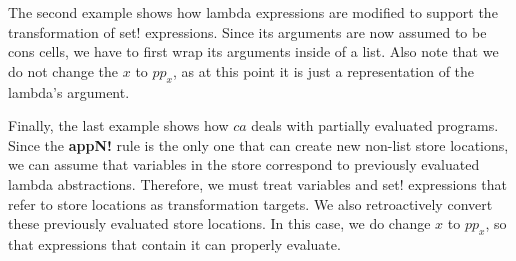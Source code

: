 The second example shows how lambda expressions are modified to support the transformation of set! expressions. Since its arguments are now assumed to be cons cells, we have to first wrap its arguments inside of a list. Also note that we do not change the $x$ to $pp_x$, as at this point it is just a representation of the lambda's argument.

Finally, the last example shows how $ca$ deals with partially evaluated programs. Since the \textbf{appN!} rule is the only one that can create new non-list store locations, we can assume that variables in the store correspond to previously evaluated lambda abstractions. Therefore, we must treat variables and set! expressions that refer to store locations as transformation targets. We also retroactively convert these previously evaluated store locations. In this case, we do change $x$ to $pp_x$, so that expressions that contain it can properly evaluate.





